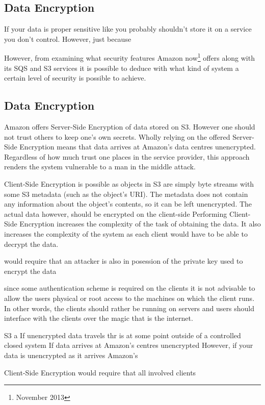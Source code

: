 \documentclass[11pt]{article}
\begin{document}
\subsection{Data Encryption}
If your data is proper sensitive like you probably shouldn't store it on a service you don't control.
However, just because 

However, from examining what security features Amazon now\footnote{November 2013} offers along with its SQS and S3 services it is possible to deduce with what kind of system a certain level of security is possible to achieve.



\subsection{Data Encryption}
Amazon offers Server-Side Encryption of data stored on S3.
However one should not trust others to keep one's own secrets.
Wholly relying on the offered Server-Side Encryption means that data arrives at Amazon's data centres unencrypted.
Regardless of how much trust one places in the service provider, this approach renders the system vulnerable to a man in the middle attack. 

Client-Side Encryption is possible as objects in S3 are simply byte streams with some S3 metadata (such as the object's URI).
The metadata does not contain any information about the object's contents, so it can be left unencrypted.
The actual data however, should be encrypted on the client-side 
Performing Client-Side Encryption increases the complexity of the task of obtaining the data.
It also increases the complexity of the system as each client would have to be able to decrypt the data.


would require that an attacker is also in posession of the private key used to encrypt the data 

since some authentication scheme is required on the clients it is not advisable to allow the users physical or root access to the machines on which the client runs. In other words, the clients should rather be running on servers and users should interface with the clients over the magic that is the internet.

S3 a
If unencrypted data travels thr
is at some point outside of a controlled closed system 
If data arrives at Amazon's centres unencrypted 
However, if your data is unencrypted as it arrives Amazon's 

Client-Side Encryption would require that all involved clients 
\end{document}
